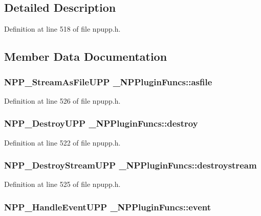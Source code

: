 \subsection{Detailed Description}


Definition at line 518 of file npupp.h.



\subsection{Member Data Documentation}
\hypertarget{struct___n_p_plugin_funcs_a8b9664b4af58ab81a4766159b5cfbdda}{
\subsubsection[{asfile}]{\setlength{\rightskip}{0pt plus 5cm}NPP\_\-StreamAsFileUPP {\bf \_\-NPPluginFuncs::asfile}}}
\label{struct___n_p_plugin_funcs_a8b9664b4af58ab81a4766159b5cfbdda}


Definition at line 526 of file npupp.h.

\hypertarget{struct___n_p_plugin_funcs_ae3b003906703936e083abbf151c689d3}{
\subsubsection[{destroy}]{\setlength{\rightskip}{0pt plus 5cm}NPP\_\-DestroyUPP {\bf \_\-NPPluginFuncs::destroy}}}
\label{struct___n_p_plugin_funcs_ae3b003906703936e083abbf151c689d3}


Definition at line 522 of file npupp.h.

\hypertarget{struct___n_p_plugin_funcs_aaa1e8bcace0ebc3c7a6b487405a791f9}{
\subsubsection[{destroystream}]{\setlength{\rightskip}{0pt plus 5cm}NPP\_\-DestroyStreamUPP {\bf \_\-NPPluginFuncs::destroystream}}}
\label{struct___n_p_plugin_funcs_aaa1e8bcace0ebc3c7a6b487405a791f9}


Definition at line 525 of file npupp.h.

\hypertarget{struct___n_p_plugin_funcs_a31a76dc9538baea794c00953c18ad2a9}{
\subsubsection[{event}]{\setlength{\rightskip}{0pt plus 5cm}NPP\_\-HandleEventUPP {\bf \_\-NPPluginFuncs::event}}}
\label{struct___n_p_plugin_funcs_a31a76dc9538baea794c00953c18ad2a9}


